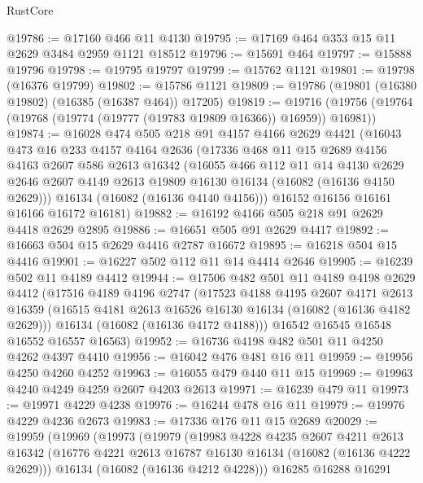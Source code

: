 \begin{lexlean}{RustCore}
\begin{coremodule}
@19786 := @17160 @466 @11 @4130
@19795 := @17169 @464 @353 @15 @11 @2629 @3484 @2959 @1121 @18512
@19796 := @15691 @464
@19797 := @15888 @19796
@19798 := @19795 @19797
@19799 := @15762 @1121
@19801 := @19798 (@16376 @19799)
@19802 := @15786 @1121
@19809 := @19786 (@19801 (@16380 @19802) (@16385 (@16387 @464)) @17205)
@19819 := @19716 (@19756 (@19764 (@19768 (@19774 (@19777 (@19783 @19809 @16366)) @16959)) @16981))
@19874 := @16028
    @474
    @505
    @218
    @91
    @4157
    @4166
    @2629
    @4421
    (@16043
      @473
      @16
      @233
      @4157
      @4164
      @2636
      (@17336
        @468
        @11
        @15
        @2689
        @4156
        @4163
        @2607
        @586
        @2613
        @16342
        (@16055
          @466
          @112
          @11
          @14
          @4130
          @2629
          @2646
          @2607
          @4149
          @2613
          @19809
          @16130
          @16134
          (@16082 (@16136 @4150 @2629)))
        @16134
        (@16082 (@16136 @4140 @4156)))
      @16152
      @16156
      @16161
      @16166
      @16172
      @16181)
@19882 := @16192 @4166 @505 @218 @91 @2629 @4418 @2629 @2895
@19886 := @16651 @505 @91 @2629 @4417
@19892 := @16663 @504 @15 @2629 @4416 @2787 @16672
@19895 := @16218 @504 @15 @4416
@19901 := @16227 @502 @112 @11 @14 @4414 @2646
@19905 := @16239 @502 @11 @4189 @4412
@19944 := @17506
    @482
    @501
    @11
    @4189
    @4198
    @2629
    @4412
    (@17516
      @4189
      @4196
      @2747
      (@17523
        @4188
        @4195
        @2607
        @4171
        @2613
        @16359
        (@16515 @4181 @2613 @16526 @16130 @16134 (@16082 (@16136 @4182 @2629)))
        @16134
        (@16082 (@16136 @4172 @4188)))
      @16542
      @16545
      @16548
      @16552
      @16557
      @16563)
@19952 := @16736 @4198 @482 @501 @11 @4250 @4262 @4397 @4410
@19956 := @16042 @476 @481 @16 @11
@19959 := @19956 @4250 @4260 @4252
@19963 := @16055 @479 @440 @11 @15
@19969 := @19963 @4240 @4249 @4259 @2607 @4203 @2613
@19971 := @16239 @479 @11
@19973 := @19971 @4229 @4238
@19976 := @16244 @478 @16 @11
@19979 := @19976 @4229 @4236 @2673
@19983 := @17336 @176 @11 @15 @2689
@20029 := @19959
    (@19969
      (@19973
        (@19979
          (@19983
            @4228
            @4235
            @2607
            @4211
            @2613
            @16342
            (@16776 @4221 @2613 @16787 @16130 @16134 (@16082 (@16136 @4222 @2629)))
            @16134
            (@16082 (@16136 @4212 @4228)))
          @16285
          @16288
          @16291

\end{coremodule}
\end{lexlean}

